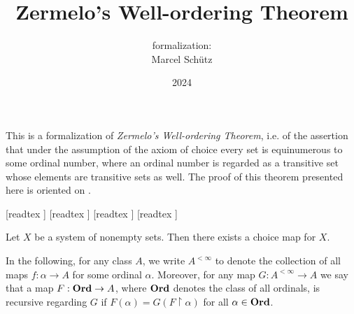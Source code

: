 \documentclass{article}
\title{Zermelo's Well-ordering Theorem}
\author{\Naproche formalization:\\[0.5em]Marcel Schütz}
\date{2024}
\begin{document}
  \maketitle

  \noindent This is a formalization of \textit{Zermelo's Well-ordering Theorem},
  i.e. of the assertion that under the assumption of the axiom of choice every
  set is equinumerous to some ordinal number, where an ordinal number is
  regarded as a transitive set whose elements are transitive sets as well.
  The proof of this theorem presented here is oriented on \cite{Koepke2018}.

  \begin{imports}
    \begin{forthel}
      [readtex ]
      [readtex ]
      [readtex ]
      [readtex ]
    \end{forthel}
  \end{imports}

  \begin{forthel}
    \begin{axiom*}
      Let $X$ be a system of nonempty sets.
      Then there exists a choice map for $X$.
    \end{axiom*}
  \end{forthel}

  \noindent In the following, for any class $A$, we write $A^{< \infty}$ to
  denote the collection of all maps $f : \alpha \to A$ for some ordinal
  $\alpha$.
  Moreover, for any map $G : A^{< \infty} \to A$ we say that a map $F : \textbf{Ord} \to
  A$, where $\textbf{Ord}$ denotes the class of all ordinals, is recursive regarding $G$
  if $F(\alpha) = G(F \restriction \alpha)$ for all $\alpha \in \textbf{Ord}$.
\end{document}
